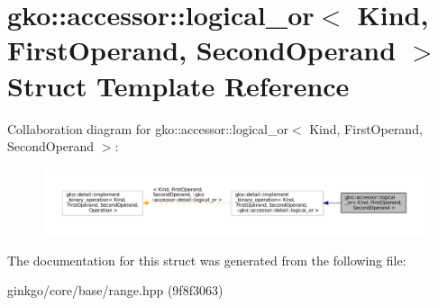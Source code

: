 \hypertarget{structgko_1_1accessor_1_1logical__or}{}\section{gko\+:\+:accessor\+:\+:logical\+\_\+or$<$ Kind, First\+Operand, Second\+Operand $>$ Struct Template Reference}
\label{structgko_1_1accessor_1_1logical__or}


Collaboration diagram for gko\+:\+:accessor\+:\+:logical\+\_\+or$<$ Kind, First\+Operand, Second\+Operand $>$\+:
\nopagebreak
\begin{figure}[H]
\begin{center}
\leavevmode
\includegraphics[width=350pt]{structgko_1_1accessor_1_1logical__or__coll__graph}
\end{center}
\end{figure}


The documentation for this struct was generated from the following file\+:\begin{DoxyCompactItemize}
\item 
ginkgo/core/base/range.\+hpp (9f8f3063)\end{DoxyCompactItemize}
